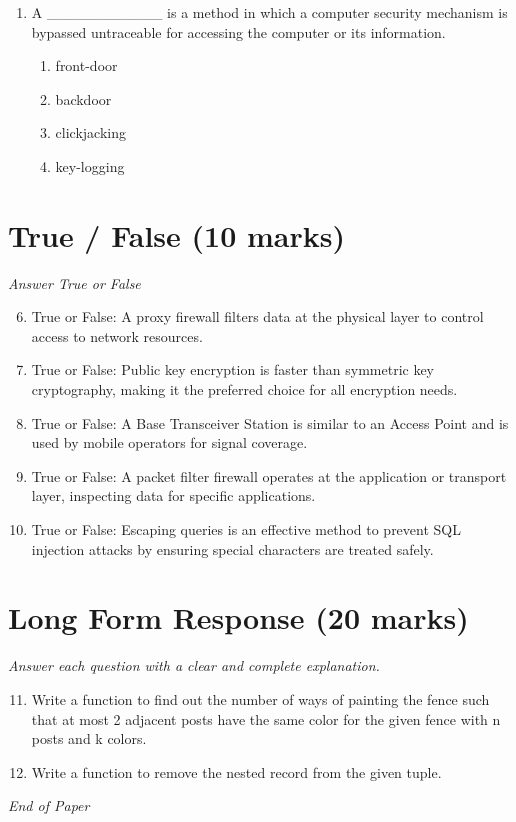 \documentclass[12pt]{article}
\begin{document}
\begin{enumerate}[label=\arabic*.]
\begin{enumerate}[label=(\alph*)]
    \item wireless handshaking
\end{enumerate}
\item A \_\_\_\_\_\_\_\_\_\_\_ is a method in which a computer security mechanism is bypassed untraceable for accessing the computer or its information.
\begin{enumerate}[label=(\alph*)]
    \item front-door
    \item backdoor
    \item clickjacking
    \item key-logging
\end{enumerate}
\end{enumerate}

\section*{True / False (10 marks)}
\textit{Answer True or False}
\begin{enumerate}[label=\arabic*.]
\setcounter{enumi}{5}
\item True or False: A proxy firewall filters data at the physical layer to control access to network resources.
\item True or False: Public key encryption is faster than symmetric key cryptography, making it the preferred choice for all encryption needs.
\item True or False: A Base Transceiver Station is similar to an Access Point and is used by mobile operators for signal coverage.
\item True or False: A packet filter firewall operates at the application or transport layer, inspecting data for specific applications.
\item True or False: Escaping queries is an effective method to prevent SQL injection attacks by ensuring special characters are treated safely.
\end{enumerate}

\section*{Long Form Response (20 marks)}
\textit{Answer each question with a clear and complete explanation.}
\begin{enumerate}[label=\arabic*.]
\setcounter{enumi}{10}
\item Write a function to find out the number of ways of painting the fence such that at most 2 adjacent posts have the same color for the given fence with n posts and k colors.
\item Write a function to remove the nested record from the given tuple.
\end{enumerate}

\vfill
\noindent\textit{End of Paper}
\end{document}
